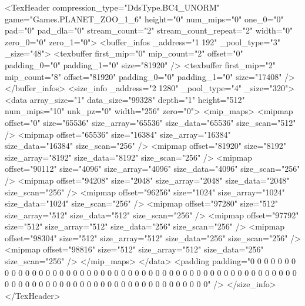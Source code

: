 <TexHeader compression_type="DdsType.BC4_UNORM" game="Games.PLANET_ZOO_1_6" height="0" num_mips="0" one_0="0" pad="0" pad_dla="0" stream_count="2" stream_count_repeat="2" width="0" zero_0="0" zero_1="0">
	<buffer_infos _address="1 192" _pool_type="3" _size="48">
		<texbuffer first_mip="0" mip_count="2" offset="0" padding_0="0" padding_1="0" size="81920" />
		<texbuffer first_mip="2" mip_count="8" offset="81920" padding_0="0" padding_1="0" size="17408" />
	</buffer_infos>
	<size_info _address="2 1280" _pool_type="4" _size="320">
		<data array_size="1" data_size="99328" depth="1" height="512" num_mips="10" unk_pz="0" width="256" zero="0">
			<mip_maps>
				<mipmap offset="0" size="65536" size_array="65536" size_data="65536" size_scan="512" />
				<mipmap offset="65536" size="16384" size_array="16384" size_data="16384" size_scan="256" />
				<mipmap offset="81920" size="8192" size_array="8192" size_data="8192" size_scan="256" />
				<mipmap offset="90112" size="4096" size_array="4096" size_data="4096" size_scan="256" />
				<mipmap offset="94208" size="2048" size_array="2048" size_data="2048" size_scan="256" />
				<mipmap offset="96256" size="1024" size_array="1024" size_data="1024" size_scan="256" />
				<mipmap offset="97280" size="512" size_array="512" size_data="512" size_scan="256" />
				<mipmap offset="97792" size="512" size_array="512" size_data="256" size_scan="256" />
				<mipmap offset="98304" size="512" size_array="512" size_data="256" size_scan="256" />
				<mipmap offset="98816" size="512" size_array="512" size_data="256" size_scan="256" />
			</mip_maps>
		</data>
		<padding padding="0 0 0 0 0 0 0 0 0 0 0 0 0 0 0 0 0 0 0 0 0 0 0 0 0 0 0 0 0 0 0 0 0 0 0 0 0 0 0 0 0 0 0 0 0 0 0 0 0 0 0 0 0 0 0 0 0 0 0 0 0 0 0 0 0 0 0 0 0 0 0 0 0 0 0 0 0 0 0 0" />
	</size_info>
</TexHeader>
